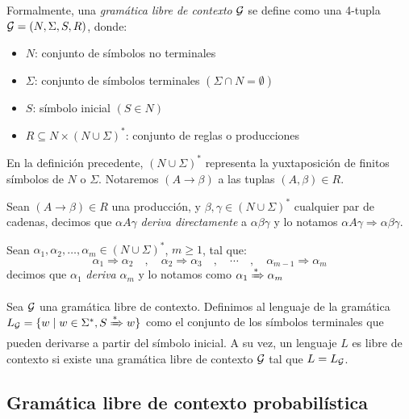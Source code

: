 \begin{definicion}[CFG]
Formalmente, una {\em gramática libre de contexto} $\gram$ se define como una 4-tupla $\gram = (N, \Sigma, S, R)$, donde:
\begin{itemize}
    \item $N$: conjunto de símbolos no terminales
    \item $\Sigma$: conjunto de símbolos terminales $(\Sigma \cap N = \emptyset)$
    \item $S$: símbolo inicial $(S \in N)$
    \item $R \subseteq N \times (N \cup \Sigma)^{\ast} $: conjunto de reglas o producciones 
\end{itemize}
\end{definicion}
En la definición precedente, $(N \cup \Sigma)^{\ast}$ representa la yuxtaposición de finitos símbolos de $N$ o $\Sigma$. Notaremos $(A \to \beta)$ a las tuplas $(A,\beta)\in R$. 


\begin{definicion}
Sean $(A \to \beta) \in R$ una producción, y $\beta, \gamma \in (N \cup \Sigma)^{\ast}$ cualquier par de cadenas, decimos que $\alpha A \gamma$ {\em deriva directamente} a $\alpha \beta \gamma$ y lo notamos $\alpha A \gamma \Rightarrow \alpha \beta \gamma$.
\end{definicion}

\begin{definicion}[Derivación]
Sean $\alpha_1, \alpha_2, \dots, \alpha_m \in (N \cup \Sigma)^{\ast}$, $m \geq 1$, tal que:
$$
\alpha_1 \Rightarrow \alpha_2\quad,\quad \alpha_2 \Rightarrow \alpha_3\quad,\quad \cdots\quad,\quad \alpha_{m-1} \Rightarrow \alpha_m
$$
decimos que $\alpha_1$ {\em deriva} $\alpha_m$ y lo notamos como $\alpha_1 \xRightarrow{\ast} \alpha_m$
\end{definicion}

\begin{definicion}
Sea $\gram$ una gramática libre de contexto. Definimos al lenguaje de la gramática $L_\gram = \{w \mid w \in \Sigma^{\ast}, S \xRightarrow{\ast} w \}$ como el conjunto de los símbolos terminales que pueden derivarse a partir del símbolo inicial. A su vez, un lenguaje $L$ es libre de contexto si existe una gramática libre de contexto $\gram$ tal que $L = L_\gram$.
\end{definicion}


\subsection{Gramática libre de contexto probabilística}\label{sub:pcfg}

